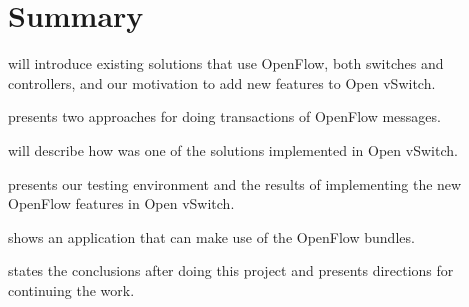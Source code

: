 \section{Summary}
 will introduce existing solutions that use OpenFlow, both switches and controllers, and our
motivation to add new features to Open vSwitch.

 presents two approaches for doing transactions of OpenFlow messages.

 will describe how was one of the solutions implemented in Open vSwitch.

 presents our testing environment and the results of implementing the new
OpenFlow features in Open vSwitch.

 shows an application that can make use of the OpenFlow bundles.

 states the conclusions after doing this project and presents
directions for continuing the work.

